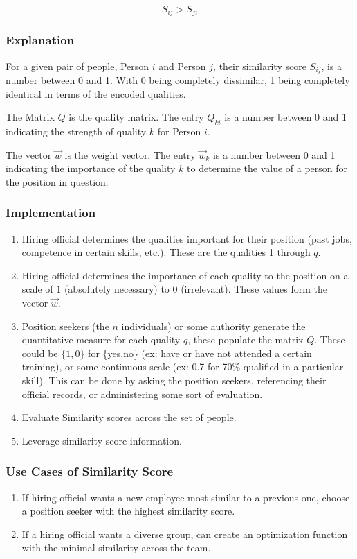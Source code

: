 \[S_{ij} > S_{ji}\]

\subsubsection{Explanation}

For a given pair of people, Person $i$ and Person $j$, their similarity score $S_{ij}$, is a number between 0 and 1. With 0 being completely dissimilar, 1 being completely identical in terms of the encoded qualities. 

The Matrix $Q$ is the quality matrix. The entry $Q_{ki}$ is a number between 0 and 1 indicating the strength of quality $k$ for Person $i$.

The vector $\vec{w}$ is the weight vector. The entry $\vec{w}_k$ is a number between 0 and 1 indicating the importance of the quality $k$ to determine the value of a person for the position in question.


\subsubsection{Implementation}

\begin{enumerate}
\item Hiring official determines the qualities important for their position (past jobs, competence in certain skills, etc.). These are the qualities 1 through $q$.
\item Hiring official determines the importance of each quality to the position on a scale of $1$ (absolutely necessary) to $0$ (irrelevant). These values form the vector $\vec{w}$.
\item Position seekers (the $n$ individuals) or some authority generate the quantitative measure for each quality $q$, these populate the matrix $Q$. These could be $\{1,0\}$ for \{yes,no\} (ex: have or have not attended a certain training), or some continuous scale (ex: 0.7 for 70\% qualified in a particular skill). This can be done by asking the position seekers, referencing their official records, or administering some sort of evaluation.
\item Evaluate Similarity scores across the set of people.
\item Leverage similarity score information.
\end{enumerate}

\subsubsection{Use Cases of Similarity Score}

\begin{enumerate}
\item If hiring official wants a new employee most similar to a previous one, choose a position seeker with the highest similarity score.
\item If a hiring official wants a diverse group, can create an optimization function with the minimal similarity across the team.
\end{enumerate}
